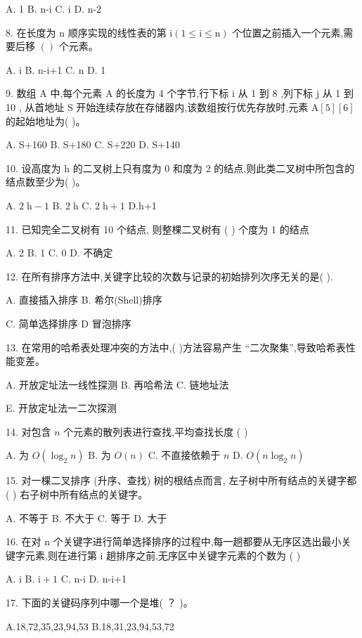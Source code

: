 A. 1 B. n-i C. i D. n-2

8. 在长度为 \(\mathrm{n}\) 顺序实现的线性表的第 \(\mathrm{i}\left( {1 \leq  \mathrm{i} \leq  \mathrm{n}}\right)\) 个位置之前插入一个元素,需要后移 \(\left( \right)\) 个元素。

A. i B. n-i+1 C. n D. 1

9. 数组 A 中,每个元素 A 的长度为 4 个字节,行下标 i 从 1 到 8 ,列下标 j 从 1 到 10 , 从首地址 \(\mathrm{S}\) 开始连续存放在存储器内,该数组按行优先存放时,元素 \(\mathrm{A}\left\lbrack  5\right\rbrack  \left\lbrack  6\right\rbrack\) 的起始地址为(  )。

A. S+160 B. S+180 C. S+220 D. S+140

10. 设高度为 \(\mathrm{h}\) 的二叉树上只有度为 0 和度为 2 的结点,则此类二叉树中所包含的结点数至少为(  )。

A. \(2\mathrm{\;h} - 1\) B. \(2\mathrm{\;h}\) C. \(2\mathrm{\;h} + 1\) D.h+1

11. 已知完全二叉树有 10 个结点, 则整棵二叉树有 (  ) 个度为 1 的结点

A. 2 B. 1 C. 0 D. 不确定

12. 在所有排序方法中,关键字比较的次数与记录的初始排列次序无关的是(  ).

A. 直接插入排序 B. 希尔(Shell)排序

C. 简单选择排序 D 冒泡排序

13. 在常用的哈希表处理冲突的方法中,(  )方法容易产生 “二次聚集”,导致哈希表性能变差。

A. 开放定址法一线性探测 B. 再哈希法 C. 链地址法

E. 开放定址法一二次探测

14. 对包含 \(n\) 个元素的散列表进行查找,平均查找长度 (  )

A. 为 \(O\left( {{\log }_{2}n}\right)\) B. 为 \(O\left( n\right)\) C. 不直接依赖于 \(n\) D. \(O\left( {n{\log }_{2}n}\right)\)

15. 对一棵二叉排序 (升序、查找) 树的根结点而言, 左子树中所有结点的关键字都 (  ) 右子树中所有结点的关键字。

A. 不等于 B. 不大于 C. 等于 D. 大于

16. 在对 \(\mathrm{n}\) 个关键字进行简单选择排序的过程中,每一趟都要从无序区选出最小关键字元素,则在进行第 \(\mathrm{i}\) 趟排序之前,无序区中关键字元素的个数为 (  )

A. i B. \(\mathrm{i} + 1\) C. n-i D. n-i+1

17. 下面的关键码序列中哪一个是堆( ？ )。

A.18,72,35,23,94,53 B.18,31,23,94,53,72

